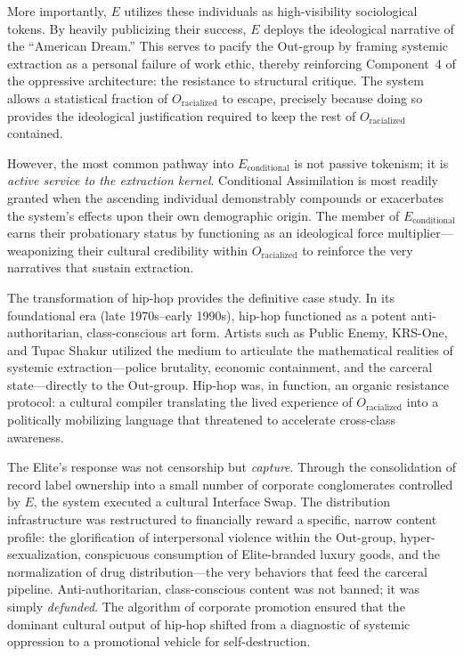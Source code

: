 \documentclass[12pt,openany]{book}
\begin{document}
More importantly, $E$ utilizes these individuals as high-visibility sociological tokens. By heavily publicizing their success, $E$ deploys the ideological narrative of the ``American Dream.'' This serves to pacify the Out-group by framing systemic extraction as a personal failure of work ethic, thereby reinforcing Component~4 of the oppressive architecture: the resistance to structural critique. The system allows a statistical fraction of $O_{\text{racialized}}$ to escape, precisely because doing so provides the ideological justification required to keep the rest of $O_{\text{racialized}}$ contained.

However, the most common pathway into $E_{\text{conditional}}$ is not passive tokenism; it is \textit{active service to the extraction kernel}. Conditional Assimilation is most readily granted when the ascending individual demonstrably compounds or exacerbates the system's effects upon their own demographic origin. The member of $E_{\text{conditional}}$ earns their probationary status by functioning as an ideological force multiplier---weaponizing their cultural credibility within $O_{\text{racialized}}$ to reinforce the very narratives that sustain extraction.

The transformation of hip-hop provides the definitive case study. In its foundational era (late 1970s--early 1990s), hip-hop functioned as a potent anti-authoritarian, class-conscious art form. Artists such as Public Enemy, KRS-One, and Tupac Shakur utilized the medium to articulate the mathematical realities of systemic extraction---police brutality, economic containment, and the carceral state---directly to the Out-group. Hip-hop was, in function, an organic resistance protocol: a cultural compiler translating the lived experience of $O_{\text{racialized}}$ into a politically mobilizing language that threatened to accelerate cross-class awareness.

The Elite's response was not censorship but \textit{capture}. Through the consolidation of record label ownership into a small number of corporate conglomerates controlled by $E$, the system executed a cultural Interface Swap. The distribution infrastructure was restructured to financially reward a specific, narrow content profile: the glorification of interpersonal violence within the Out-group, hyper-sexualization, conspicuous consumption of Elite-branded luxury goods, and the normalization of drug distribution---the very behaviors that feed the carceral pipeline. Anti-authoritarian, class-conscious content was not banned; it was simply \textit{defunded}. The algorithm of corporate promotion ensured that the dominant cultural output of hip-hop shifted from a diagnostic of systemic oppression to a promotional vehicle for self-destruction.
\end{document}
